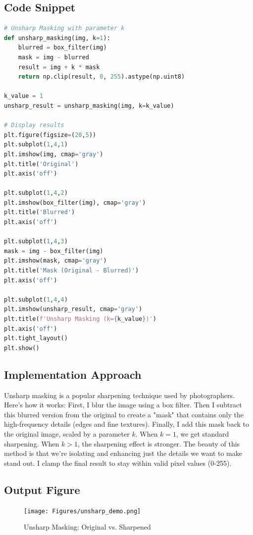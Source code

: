 \documentclass[12pt,a4paper]{report}
\begin{document}
\subsection{Code Snippet}
\begin{lstlisting}[language=Python, caption={Unsharp Masking}]
# Unsharp Masking with parameter k
def unsharp_masking(img, k=1):
    blurred = box_filter(img)
    mask = img - blurred
    result = img + k * mask
    return np.clip(result, 0, 255).astype(np.uint8)

k_value = 1
unsharp_result = unsharp_masking(img, k=k_value)

# Display results
plt.figure(figsize=(20,5))
plt.subplot(1,4,1)
plt.imshow(img, cmap='gray')
plt.title('Original')
plt.axis('off')

plt.subplot(1,4,2)
plt.imshow(box_filter(img), cmap='gray')
plt.title('Blurred')
plt.axis('off')

plt.subplot(1,4,3)
mask = img - box_filter(img)
plt.imshow(mask, cmap='gray')
plt.title('Mask (Original - Blurred)')
plt.axis('off')

plt.subplot(1,4,4)
plt.imshow(unsharp_result, cmap='gray')
plt.title(f'Unsharp Masking (k={k_value})')
plt.axis('off')
plt.tight_layout()
plt.show()
\end{lstlisting}

\subsection{Implementation Approach}
Unsharp masking is a popular sharpening technique used by photographers. Here's how it works: First, I blur the image using a box filter. Then I subtract this blurred version from the original to create a "mask" that contains only the high-frequency details (edges and fine textures). Finally, I add this mask back to the original image, scaled by a parameter \(k\). When \(k=1\), we get standard sharpening. When \(k>1\), the sharpening effect is stronger. The beauty of this method is that we're isolating and enhancing just the details we want to make stand out. I clamp the final result to stay within valid pixel values (0-255).

\subsection{Output Figure}
\begin{figure}[H]
\centering
\texttt{[image: Figures/unsharp\_demo.png]}
\caption{Unsharp Masking: Original vs. Sharpened}
\end{figure}
\end{document}
